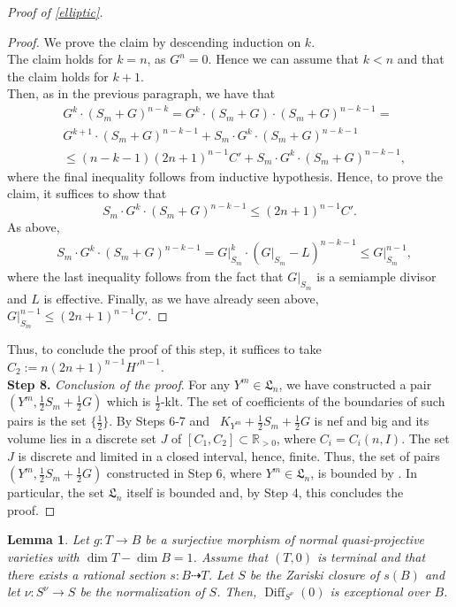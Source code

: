 \documentclass{amsart}[12pt,a4paper]
\newtheorem{lemma}[theorem]{Lemma}
\theoremstyle{definition}
\DeclareMathOperator{\diff}{\mathrm{Diff}}
\begin{document}
\begin{proof}[Proof of \ref{elliptic}]
\begin{proof}
We prove the claim by descending induction on $k$.\\
The claim holds for $k=n$, as $G^n=0$.
Hence we can assume that $k<n$ and that the claim holds for $k+1$.\\
Then, as in the previous paragraph, we have that
\begin{align*}
& G^k\cdot (S_m+G)^{n-k} = G^k\cdot (S_m+G) \cdot (S_m+G)^{n-k-1} = \\
& G^{k+1} \cdot (S_m+G)^{n-k-1} + S_m \cdot G^{k} \cdot (S_m+G)^{n-k-1} \\ 
& \leq (n-k-1)(2n+1)^{n-1} C' +  S_m \cdot G^{k} \cdot (S_m+G)^{n-k-1},
\end{align*}
where the final inequality follows from inductive hypothesis.
Hence, to prove the claim, it suffices to show that 
\[
S_m \cdot G^{k} \cdot (S_m+G)^{n-k-1} \leq (2n+1)^{n-1} C'.
\]
As above, 
\begin{align*}
& S_m \cdot G^{k} \cdot (S_m+G)^{n-k-1}  =
G\vert_{S_m}^{k} \cdot (G\vert_{S_m} - L)^{n-k-1} \leq G\vert_{S_m}^{n-1},
\end{align*}
where the last inequality follows from the fact that $G\vert_{S_m}$ is a semiample divisor and $L$ is effective.
Finally, as we have already seen above, $G\vert_{S_m}^{n-1} \leq (2n+1)^{n-1} C'$.
\end{proof}
\noindent
Thus, to conclude the proof of this step, it suffices to take $C_2 := n(2n+1)^{n-1} H'^{n-1}$.\\

{\bf Step 8.} {\it Conclusion of the proof}.
\newline
For any $Y^m \in \mathfrak{L}_n$, we have constructed a pair $(Y^m, \frac 1 2 S_m+\frac 1 2 G)$ which is $\frac 1 2$-klt. 
The set of coefficients of the boundaries of such pairs is the set $\{\frac 1 2\}$.
By Steps 6-7 and~\cite[Theorem 1.3]{Fil18} $K_{Y^m}+\frac 1 2 S_m+\frac 1 2 G$ is nef and big and its volume lies in a discrete set $J$ of $[C_1, C_2] \subset \mathbb{R}_{>0}$, where $C_i=C_i(n, I)$.
The set $J$ is discrete and limited in a closed interval, hence, finite.
Thus, the set of pairs $(Y^m, \frac 1 2 S_m+\frac 1 2 G)$ constructed in Step 6, where $Y^m \in \mathfrak{L}_n$, is bounded by \cite[Theorem 6]{MST16}.
In particular, the set $\mathfrak{L}_n$ itself is bounded and, by Step 4, this concludes the proof.
\end{proof}

\begin{lemma}\label{section.lemma}
Let $g \colon T \to B$ be a surjective morphism of normal quasi-projective varieties with $\dim T -\dim B=1$.
Assume that $(T, 0)$ is terminal and that there exists a rational section $s \colon B \dashrightarrow T$.
Let $S$ be the Zariski closure of $s(B)$ and let $\nu\colon S^\nu \to S$ be the normalization of $S$. 
Then, $\diff_{S^\nu}(0)$ is exceptional over $B$.
\end{lemma}
\end{document}
